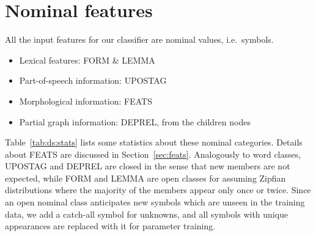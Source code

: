 \documentclass[11pt]{article}
\begin{document}
\section{Nominal features}
\label{sec:embed}

All the input features for our classifier are nominal values, i.e.\ symbols.

\begin{itemize}
\item Lexical features: FORM \& LEMMA
\item Part-of-speech information: UPOSTAG
\item Morphological information: FEATS
\item Partial graph information: DEPREL, from the children nodes
\end{itemize}

Table~\ref{tab:ds:stats} lists some statistics about these nominal categories.
Details about FEATS are discussed in Section~\ref{sec:feats}.
Analogously to word classes,
UPOSTAG and DEPREL are closed in the sense that new members are not expected,
while FORM and LEMMA are open classes for assuming Zipfian distributions where the majority of the members appear only once or twice.
Since an open nominal class anticipates new symbols which are unseen in the training data,
we add a catch-all symbol for unknowns,
and all symbols with unique appearances are replaced with it for parameter training.
\end{document}
